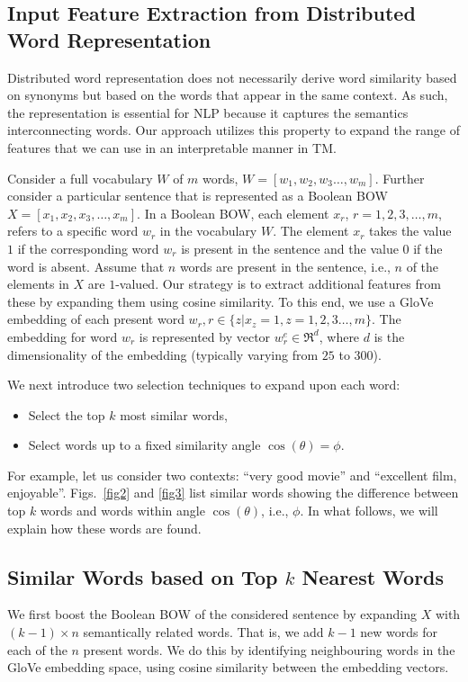 \documentclass[11pt]{article}
\begin{document}
\subsection{Input Feature Extraction from Distributed Word Representation}
Distributed word representation does not necessarily derive word similarity based on synonyms but based on the words that appear in the same context. As such, the representation is essential for NLP because it captures the semantics interconnecting words. Our approach utilizes this property to expand the range of features that we can use in an interpretable manner in TM.

\par Consider a full vocabulary $W$ of $m$ words, $W = [w_1, w_2, w_3 \ldots, w_m]$. Further consider a particular sentence that is represented as a Boolean BOW \(X = [x_1, x_2, x_3 , \ldots, x_m]\). In a Boolean BOW, each element $x_r$, \(r=1,2,3,\ldots, m\), refers to a specific word $w_r$ in the vocabulary $W$. The element $x_r$ takes the value $1$ if the corresponding word $w_r$ is present in the sentence and the value $0$ if the word is absent.  Assume that \(n\) words are present in the sentence, i.e., $n$ of the elements in $X$ are $1$-valued. Our strategy is to extract additional features from these by expanding them using cosine similarity. To this end, we use a GloVe embedding of each present word \(w_r, r \in \{z | x_z = 1, z=1,2,3\ldots,m\}\). The embedding for word $w_r$ is represented by vector \(w_r^{e} \in \Re^d\), where \(d\) is the dimensionality of the embedding (typically varying from $25$ to $300$).

We next introduce two selection techniques to expand upon each word: 
\begin{itemize}
    \item Select the top \(k\) most similar words,
    \item Select words up to a fixed similarity angle \(\cos(\theta) = \phi\).
\end{itemize}
\noindent For example, let us consider two contexts: ``very good movie'' and ``excellent film, enjoyable''.  Figs.~\ref{fig2} and \ref{fig3} list similar words showing the difference between top \(k\) words and words within angle \(\cos(\theta)\), i.e., \(\phi\). In what follows, we will explain how these words are found. 

\subsection{Similar Words based on Top \(k\) Nearest Words}
We first boost the Boolean BOW of the considered sentence by expanding $X$ with \((k-1) \times n\) semantically related words. That is, we add $k-1$ new words for each of the $n$ present words. We do this by identifying neighbouring words in the GloVe embedding space, using cosine similarity between the embedding vectors. 
\end{document}
